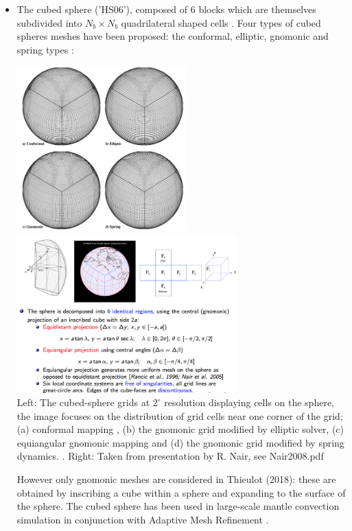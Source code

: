 \begin{itemize}
\item 
The cubed sphere ('HS06'), composed of 6 blocks which 
are themselves subdivided into $N_b \times N_b$ quadrilateral shaped cells  \cite{sado72,roip96,heta03,busa13}.
Four types of cubed spheres meshes have been proposed: the conformal, elliptic, gnomonic and spring types \cite{puli07}:


\begin{center}
\includegraphics[width=6.5cm]{images/meshes/puli07}
\includegraphics[width=8.5cm]{images/meshes/cubed_nair}\\
{\captionfont 
Left: The cubed-sphere grids at $2^\circ$ resolution displaying cells on the sphere,
 the image focuses on the distribution of grid cells near one corner of the grid;
 (a) conformal mapping \cite{rapm96,mcgr96}, (b) the gnomonic grid modified by elliptic solver,
 (c) equiangular gnomonic mapping and (d) the gnomonic grid modified by spring dynamics. \cite{puli07}.
Right: Taken from presentation by R. Nair, see Nair2008.pdf
}
\end{center}

However only gnomonic meshes are considered in Thieulot (2018): these 
are obtained by inscribing a cube within a sphere and expanding to the surface
of the sphere.
The cubed sphere has been used in large-scale mantle convection simulation in conjunction with 
Adaptive Mesh Refinement \cite{algs12,busa13}.  


\end{itemize}
